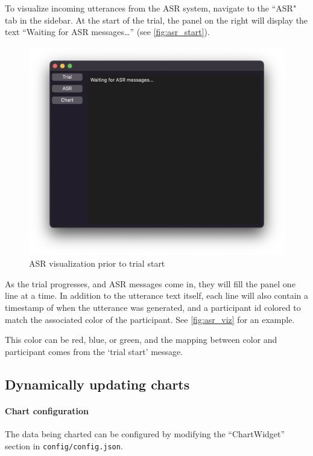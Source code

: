 To visualize incoming utterances from the ASR system, navigate to the ``ASR"
tab in the sidebar. At the start of the trial, the panel on the right will
display the text ``Waiting for ASR messages…'' (see \autoref{fig:asr_start}).

\begin{figure}
    \centering
    \includegraphics[width=\textwidth]{figures/asr_start}
    \caption{ASR visualization prior to trial start}
    \label{fig:asr_start}
\end{figure}

As the trial progresses, and ASR messages come in, they will fill the panel one
line at a time. In addition to the utterance text itself, each line will also
contain a timestamp of when the utterance was generated, and a participant id
colored to match the associated color of the participant. See
\autoref{fig:asr_viz} for an example.

This color can be red, blue, or green, and the mapping between color and
participant comes from the `trial start' message.

\subsection{Dynamically updating charts}

\paragraph{Chart configuration}

The data being charted can be configured by modifying the ``ChartWidget''
section in \texttt{config/config.json}.

